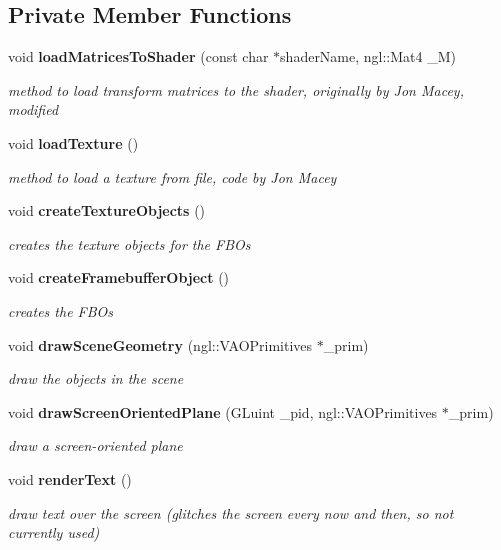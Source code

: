 \subsection*{Private Member Functions}
\begin{DoxyCompactItemize}
\item 
void \textbf{ load\+Matrices\+To\+Shader} (const char $\ast$shader\+Name, ngl\+::\+Mat4 \+\_\+M)
\begin{DoxyCompactList}\small\item\em method to load transform matrices to the shader, originally by Jon Macey, modified \end{DoxyCompactList}\item 
void \textbf{ load\+Texture} ()
\begin{DoxyCompactList}\small\item\em method to load a texture from file, code by Jon Macey \end{DoxyCompactList}\item 
void \textbf{ create\+Texture\+Objects} ()
\begin{DoxyCompactList}\small\item\em creates the texture objects for the F\+B\+Os \end{DoxyCompactList}\item 
void \textbf{ create\+Framebuffer\+Object} ()
\begin{DoxyCompactList}\small\item\em creates the F\+B\+Os \end{DoxyCompactList}\item 
void \textbf{ draw\+Scene\+Geometry} (ngl\+::\+V\+A\+O\+Primitives $\ast$\+\_\+prim)
\begin{DoxyCompactList}\small\item\em draw the objects in the scene \end{DoxyCompactList}\item 
void \textbf{ draw\+Screen\+Oriented\+Plane} (G\+Luint \+\_\+pid, ngl\+::\+V\+A\+O\+Primitives $\ast$\+\_\+prim)
\begin{DoxyCompactList}\small\item\em draw a screen-\/oriented plane \end{DoxyCompactList}\item 
void \textbf{ render\+Text} ()
\begin{DoxyCompactList}\small\item\em draw text over the screen (glitches the screen every now and then, so not currently used) \end{DoxyCompactList}\item 

\end{DoxyCompactItemize}
